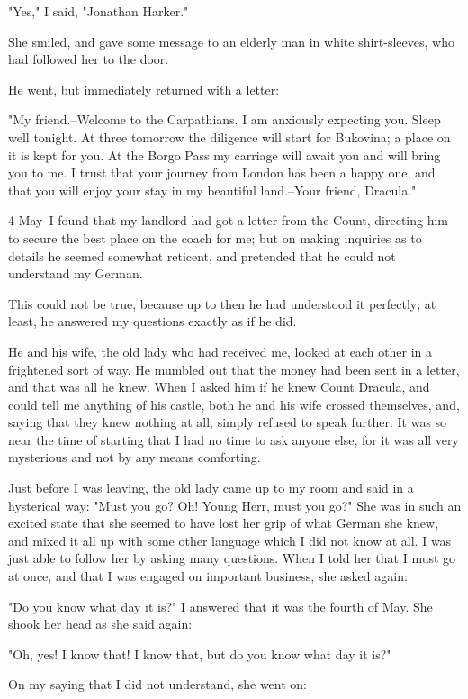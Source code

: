 "Yes," I said, "Jonathan Harker." 

She smiled, and gave some message to an elderly man in white shirt-sleeves, who had followed her to the door. 

He went, but immediately returned with a letter: 

"My friend.--Welcome to the Carpathians. I am anxiously expecting you. Sleep well tonight. At three tomorrow the diligence will start for Bukovina; a place on it is kept for you. At the Borgo Pass my carriage will await you and will bring you to me. I trust that your journey from London has been a happy one, and that you will enjoy your stay in my beautiful land.--Your friend, Dracula." 

4 May--I found that my landlord had got a letter from the Count, directing him to secure the best place on the coach for me; but on making inquiries as to details he seemed somewhat reticent, and pretended that he could not understand my German. 

This could not be true, because up to then he had understood it perfectly; at least, he answered my questions exactly as if he did. 

He and his wife, the old lady who had received me, looked at each other in a frightened sort of way. He mumbled out that the money had been sent in a letter, and that was all he knew. When I asked him if he knew Count Dracula, and could tell me anything of his castle, both he and his wife crossed themselves, and, saying that they knew nothing at all, simply refused to speak further. It was so near the time of starting that I had no time to ask anyone else, for it was all very mysterious and not by any means comforting. 

Just before I was leaving, the old lady came up to my room and said in a hysterical way: "Must you go? Oh! Young Herr, must you go?" She was in such an excited state that she seemed to have lost her grip of what German she knew, and mixed it all up with some other language which I did not know at all. I was just able to follow her by asking many questions. When I told her that I must go at once, and that I was engaged on important business, she asked again: 

"Do you know what day it is?" I answered that it was the fourth of May. She shook her head as she said again: 

"Oh, yes! I know that! I know that, but do you know what day it is?" 

On my saying that I did not understand, she went on: 


